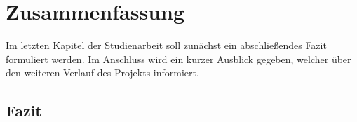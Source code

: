 \section{Zusammenfassung}
Im letzten Kapitel der Studienarbeit soll zunächst ein abschließendes Fazit formuliert werden. Im Anschluss wird ein kurzer Ausblick gegeben, welcher über den weiteren Verlauf des Projekts informiert.

\subsection{Fazit}

